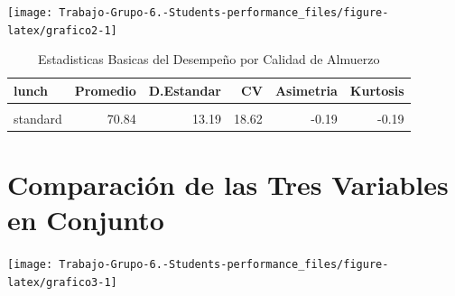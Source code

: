 \documentclass[
]{article}
\begin{document}
\begin{center}\texttt{[image: Trabajo-Grupo-6.-Students-performance\_files/figure-latex/grafico2-1]} \end{center}

\begin{table}[!h]
\centering
\caption{\label{tab:calculos basicos2}Estadisticas Basicas del Desempeño por Calidad de Almuerzo}
\centering
\begin{tabular}[t]{lrrrrr}
\toprule
lunch & Promedio & D.Estandar & CV & Asimetria & Kurtosis\\
\midrule
\cellcolor{gray!10}{free/reduced} & \cellcolor{gray!10}{62.20} & \cellcolor{gray!10}{14.46} & \cellcolor{gray!10}{23.25} & \cellcolor{gray!10}{-0.31} & \cellcolor{gray!10}{0.22}\\
standard & 70.84 & 13.19 & 18.62 & -0.19 & -0.19\\
\bottomrule
\end{tabular}
\end{table}

\section{Comparación de las Tres Variables en
Conjunto}\label{comparaciuxf3n-de-las-tres-variables-en-conjunto}

\begin{center}\texttt{[image: Trabajo-Grupo-6.-Students-performance\_files/figure-latex/grafico3-1]} \end{center}
\end{document}

